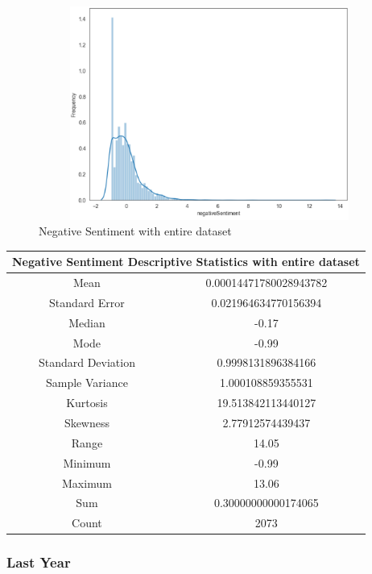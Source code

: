 \begin{figure}[h!]
\centering
\includegraphics[width=15cm,height=7cm,keepaspectratio]{resultsEvaluation/negativeDescMax.png}
\caption{Negative Sentiment with entire dataset}
\label{fig:appendix_negativeDescMax}
\end{figure}
\begin{center}
\begin{tabular}{ c c }
\hline
\multicolumn{2}{|c|}{Negative Sentiment Descriptive Statistics with entire dataset} \\
\hline
Mean & 0.00014471780028943782 \\
Standard Error & 0.021964634770156394 \\
Median & -0.17 \\
Mode & -0.99 \\
Standard Deviation & 0.9998131896384166 \\
Sample Variance & 1.000108859355531 \\
Kurtosis & 19.513842113440127 \\
Skewness & 2.77912574439437 \\
Range & 14.05 \\
Minimum & -0.99 \\
Maximum & 13.06 \\
Sum & 0.30000000000174065 \\
Count & 2073
\end{tabular}
\end{center}

\subsubsection{Last Year}


